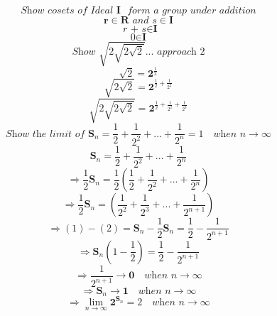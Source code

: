 \documentclass[10pt]{article}
\begin{document}
$$\textit{Show cosets of Ideal}\textbf{ I }\textit{ form a group under addition}$$
$$\textbf{r}\in\textbf{R}\textit{ and }\textit{s}\in\textbf{I}$$
$$\textit{ r + s}\in\textbf{I}$$
$$\textit{0}\in\textbf{I}$$
$$\textit{Show }\sqrt{2\sqrt{2\sqrt{2}}}...\textit{ approach 2}$$
$$\sqrt{2}=\textbf{2}^\frac{1}{2}$$
$$\sqrt{2\sqrt{2}}=\textbf{2}^{\frac{1}{2}+\frac{1}{2^2}}$$
$$\sqrt{2\sqrt{2\sqrt{2}}}=\textbf{2}^{\frac{1}{2}+\frac{1}{2^2}+\frac{1}{2^3} }$$
$$\textit{Show the limit of }\textbf{S}_{n}=\frac{1}{2}+\frac{1}{2^2}+...+\frac{1}{2^n}=1\quad\textit{when n}\rightarrow\infty$$
$$\textbf{S}_{n}=\frac{1}{2}+\frac{1}{2^2}+...+\frac{1}{2^n}$$
$$\Rightarrow \frac{1}{2}\textbf{S}_{n}=\frac{1}{2}(\frac{1}{2}+\frac{1}{2^2}+...+\frac{1}{2^n})$$
$$\Rightarrow \frac{1}{2}\textbf{S}_{n}=(\frac{1}{2^2}+\frac{1}{2^3}+...+\frac{1}{2^{n+1}})$$
$$\Rightarrow (1)-(2)=\textbf{S}_{n}-\frac{1}{2}\textbf{S}_{n}=\frac{1}{2}-\frac{1}{2^{n+1}}$$
$$\Rightarrow \textbf{S}_{n}(1-\frac{1}{2})=\frac{1}{2}-\frac{1}{2^{n+1}}$$
$$\Rightarrow \frac{1}{2^{n+1}}\rightarrow\textbf{0}\quad\textit{when n}\rightarrow\infty$$
$$\Rightarrow \textbf{S}_{n}\rightarrow\textbf{1}\quad\textit{when n}\rightarrow\infty$$
$$\Rightarrow \lim_{n \to \infty}\textbf{2}^{\textbf{S}_{n}}=2\quad\textit{when n}\rightarrow\infty$$
\end{document}
